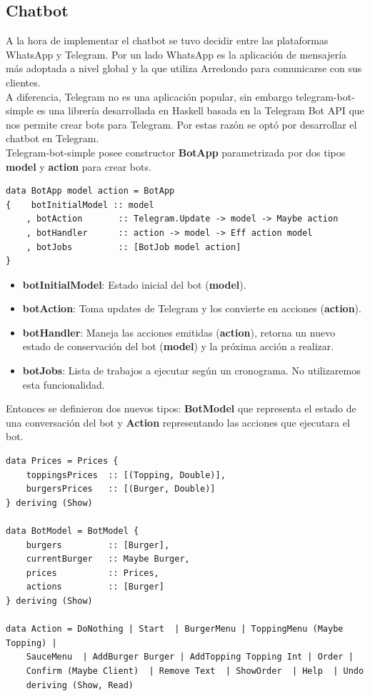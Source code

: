 \documentclass[a4paper,12pt]{article}
\begin{document}
\subsection{Chatbot	}

A la hora de implementar el chatbot se tuvo decidir entre las plataformas WhatsApp y Telegram. Por un lado WhatsApp es la aplicación de mensajería más adoptada a nivel global y la que utiliza Arredondo para comunicarse con sus clientes.
\\
A diferencia, Telegram no es una aplicación popular, sin embargo telegram-bot-simple \cite{telegram-bot-simple} es una librería desarrollada en Haskell basada en la Telegram Bot API \cite{telegram-bot-api} que nos permite crear bots para Telegram. Por estas razón se optó por desarrollar el chatbot en Telegram.
\\
Telegram-bot-simple posee constructor \textbf{BotApp} parametrizada por dos tipos \textbf{model} y \textbf{action} para crear bots.

\begin{verbatim}
data BotApp model action = BotApp
{	 botInitialModel :: model
	, botAction       :: Telegram.Update -> model -> Maybe action
	, botHandler      :: action -> model -> Eff action model
	, botJobs         :: [BotJob model action]
}
\end{verbatim}

\begin{itemize}
	\item \textbf{botInitialModel}: Estado inicial del bot (\textbf{model}).
	\item \textbf{botAction}: Toma updates de Telegram y los convierte en acciones (\textbf{action}).
	\item \textbf{botHandler}: Maneja las acciones emitidas (\textbf{action}), retorna un nuevo estado de conservación del bot (\textbf{model}) y la próxima acción a realizar.
	\item \textbf{botJobs}: Lista de trabajos a ejecutar según un cronograma. No utilizaremos esta funcionalidad.
\end{itemize}

Entonces se definieron dos nuevos tipos: \textbf{BotModel} que representa el estado de una conversación del bot y \textbf{Action} representando las acciones que ejecutara el bot.

\begin{verbatim}
data Prices = Prices {
	toppingsPrices  :: [(Topping, Double)],
	burgersPrices   :: [(Burger, Double)]
} deriving (Show)

data BotModel = BotModel {
	burgers         :: [Burger],
	currentBurger   :: Maybe Burger,
	prices          :: Prices,
	actions         :: [Burger]
} deriving (Show)

data Action = DoNothing | Start  | BurgerMenu | ToppingMenu (Maybe Topping) |
	SauceMenu  | AddBurger Burger | AddTopping Topping Int | Order |
	Confirm (Maybe Client)  | Remove Text  | ShowOrder  | Help  | Undo
	deriving (Show, Read)
\end{verbatim}
\end{document}
